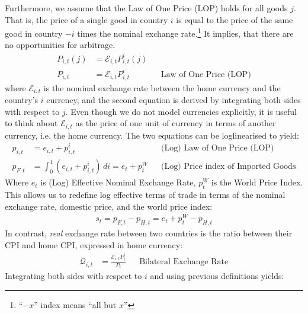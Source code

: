 Furthermore, we assume that the Law of One Price (LOP) holds for all goods $j$. That is, the price of a single good in country $i$ is equal to the price of the same good in country $-i$ times the nominal exchange rate.\footnote{``$-x$'' index means ``all but $x$''} It implies, that there are no opportunities for arbitrage.
\begin{align}
    P_{i,t}(j) & = \mathcal{E}_{i,t}P_{i,t}^i(j)                                                                         &  &               \\
    P_{i,t}    & = \mathcal{E}_{i,t}P_{i,t}^i                                                                            &  & \text{Law of One Price (LOP)}              
\end{align}
where $\mathcal{E}_{i,t}$ is the nominal exchange rate between the home currency and the country's $i$ currency, and the second equation is derived by integrating both sides with respect to $j$. Even though we do not model currencies explicitly, it is useful to think about $\mathcal{E}_{i,t}$ as the price of one unit of currency in terms of another currency, i.e. the home currency. The two equations can be loglinearised to yield:
\begin{align}
    p_{i,t}    & = e_{i,t}+p_{i,t}^i                                                                                     &  & \text{(Log) Law of One Price (LOP)}        \\
    p_{F,t}    & = \int_{0}^{1}(e_{i,t}+p_{i,t}^i) \,di = e_t + p_t^{W} \label{eq:log_price_index_of_imported_goods} &  & \text{(Log) Price index of Imported Goods}
\end{align}
Where $e_t$ is (Log) Effective Nominal Exchange Rate, $p_t^{W}$ is the World Price Index. This allows us to redefine log effective terms of trade in terms of the nominal exchange rate, domestic price, and the world price index:
\begin{align}
    s_t = p_{F,t} - p_{H,t} = e_t + p_t^{W} - p_{H,t} \label{eq:terms_of_trade_with_world_price_index}
\end{align}
In contrast, \textit{real} exchange rate between two countries is the ratio between their CPI and home CPI, expressed in home currency:
\begin{align}
    \mathcal{Q}_{i,t} & = \frac{\mathcal{E}_{i,t}P_{t}^i}{P_t}                                        &  & \text{Bilateral Exchange Rate}                                       
\end{align}
Integrating both sides with respect to $i$ and using previous definitions yields:

